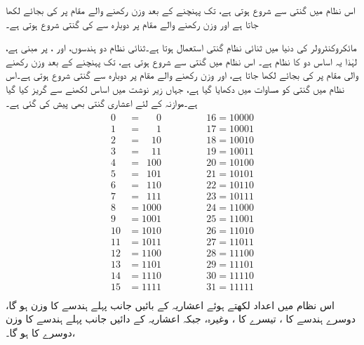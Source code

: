 	اس نظام میں گنتی   سے شروع ہوتی ہے،   تک پہنچنے کے  بعد    وزن رکھنے والے مقام پر    کی بجائے     لکھا جاتا ہے اور   وزن رکھنے والے مقام پر دوبارہ   سے     کی  گنتی شروع ہوتی ہے۔

	مائکروکنٹرولر کی دنیا میں ثنائی نظامِ گنتی استعمال ہوتا ہے۔ثنائی نظام  دو ہندسوں،    اور ،  پر مبنی ہے،  لہٰذا  یہ  اساس دو   کا نظام  ہے۔
	اس نظام میں گنتی  سے شروع ہوتی ہے،  تک پہنچنے کے بعد     وزن رکھنے  والی مقام پر  کی بجائے  لکھا جاتا ہے،  اور  وزن رکھنے والے مقام پر دوبارہ  سے   گنتی شروع ہوتی ہے۔اس نظام میں گنتی کو  مساوات  میں دکھایا گیا ہے، جہاں زیر نوشت میں اساس لکھنے سے گریز کیا گیا ہے۔موازنہ کے لئے اعشاری گنتی بھی پیش کی  گئی ہے۔
\begin{gather}
\begin{aligned}\label{مساوات_ثنائی_گنتی}
0&=\phantom{000}0 &\quad \quad \quad  &16=10000\\
1&=\phantom{000}1 &\quad \quad \quad  &17=10001\\
2&=\phantom{00}10 &\quad \quad \quad  &18=10010\\
3&=\phantom{00}11 &\quad \quad \quad  &19=10011\\
4&=\phantom{0}100 &\quad \quad \quad  &20=10100\\
5&=\phantom{0}101 &\quad \quad \quad  &21=10101\\
6&=\phantom{0}110 &\quad \quad \quad  &22=10110\\
7&=\phantom{0}111 &\quad \quad \quad  &23=10111\\
8&=1000 &\quad \quad \quad  &24=11000\\
9&=1001 &\quad \quad \quad  &25=11001\\
10&=1010 &\quad \quad \quad  &26=11010\\
11&=1011 &\quad \quad \quad  &27=11011\\
12&=1100 &\quad \quad \quad  &28=11100\\
13&=1101 &\quad \quad \quad  &29=11101\\
14&=1110 &\quad \quad \quad  &30=11110\\
15&=1111 &\quad \quad \quad  &31=11111\\
\end{aligned}
\end{gather}
	اس نظام میں اعداد لکھتے ہوئے اعشاریہ کے بائیں جانب پہلے ہندسے کا وزن    ہو گا،   دوسرے  ہندسے کا    ، تیسرے کا ،    وغیرہ،  جبکہ اعشاریہ کے دائیں جانب پہلے ہندسے کا وزن  ،دوسرے کا  ہو گا۔
	
